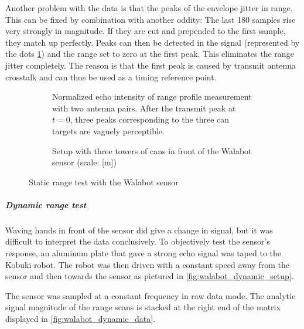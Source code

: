 Another problem with the data is that the peaks of the envelope jitter in range. This can be fixed by combination with another oddity: The last 180 samples rise very strongly in magnitude. If they are cut and prepended to the first sample, they match up perfectly. Peaks can then be detected in the signal (represented by the dots \cref{fig:walabot_rangetest_data}) and the range set to zero at the first peak. This eliminates the range jitter completely. The reason is that the first peak is caused by transmit antenna crosstalk and can thus be used as a timing reference point.

\begin{figure}[htbp]
    \centering
    \begin{subfigure}{.8\textwidth}
        \centering
        \def\svgwidth{\linewidth}
        
        \caption{Normalized echo intensity of range profile measurement with two antenna pairs. After the transmit peak at \(t=0\), three peaks corresponding to the three can targets are vaguely perceptible.}
        \label{fig:walabot_rangetest_data}
    \end{subfigure}
    \begin{subfigure}{.8\textwidth}
        \centering
        \def\svgwidth{\linewidth}
        
        \caption{Setup with three towers of cans in front of the Walabot sensor (scale: [\si{m}])}
        \label{fig:walabot_rangetest_setup}
    \end{subfigure}
    \caption{Static range test with the Walabot sensor}
    \label{fig:walabot_rangetest}
\end{figure}

\subparagraph{Dynamic range test}\label{dynamic-range-test}

Waving hands in front of the sensor did give a change in signal, but it
was difficult to interpret the data conclusively. To objectively test
the sensor's response, an aluminum plate that gave a strong echo signal
was taped to the Kobuki robot. The robot was then driven with a constant
speed away from the sensor and then towards the sensor as pictured in
\cref{fig:walabot_dynamic_setup}.

The sensor was sampled at a constant frequency in raw data mode. The
analytic signal magnitude of the range scans is stacked at the right end of the
matrix displayed in \cref{fig:walabot_dynamic_data}.


